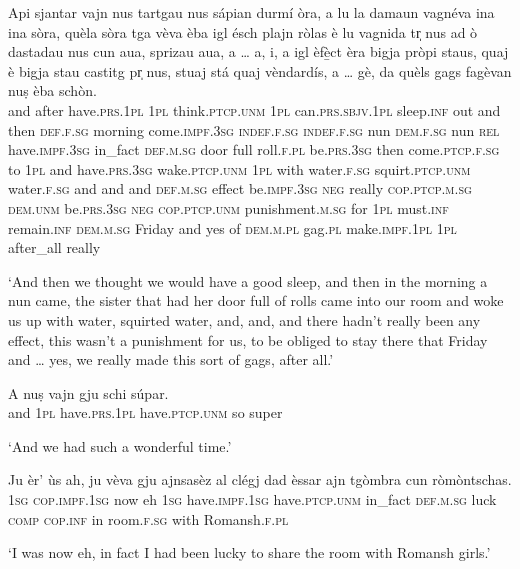 \begin{linenumbers}
\gll    Api sjantar vajn nus tartgau nus sápian durmí òra, a lu la damaun vagnéva ina ina sòra, quèla sòra tga vèva èba igl ésch plajn ròlas è lu vagnida tr̩ nus ad ò dastadau nus cun aua, sprizau aua, a … a, i, a igl èfè̱ct èra bigja pròpi staus, quaj è bigja stau castitg pr̩ nus, stuaj stá quaj vèndardís, a … gè, da quèls gags fagèvan nuṣ èba schòn.\\
and after have.\textsc{prs.1pl} \textsc{1pl} think.\textsc{ptcp.unm} \textsc{1pl}  can.\textsc{prs.sbjv.1pl} sleep.\textsc{inf} out and then \textsc{def.f.sg} morning come.\textsc{impf.3sg} \textsc{indef.f.sg} \textsc{indef.f.sg} nun \textsc{dem.f.sg} nun \textsc{rel} have.\textsc{impf.3sg} in\_fact \textsc{def.m.sg} door full roll.\textsc{f.pl} be.\textsc{prs.3sg} then come.\textsc{ptcp.f.sg} to \textsc{1pl} and have.\textsc{prs.3sg} wake.\textsc{ptcp.unm} \textsc{1pl} with water.\textsc{f.sg} squirt.\textsc{ptcp.unm} water.\textsc{f.sg} and {} and  and {} \textsc{def.m.sg} effect be.\textsc{impf.3sg} \textsc{neg} really  \textsc{cop.ptcp.m.sg} \textsc{dem.unm} be.\textsc{prs.3sg} \textsc{neg} \textsc{cop.ptcp.unm} punishment.\textsc{m.sg} for \textsc{1pl} must.\textsc{inf}  remain.\textsc{inf} \textsc{dem.m.sg} Friday and {} yes of \textsc{dem.m.pl} gag.\textsc{pl} make.\textsc{impf.1pl} \textsc{1pl} after\_all really\\
\end{linenumbers}
\medskip
\glt `And then we thought we would have a good sleep, and then in the morning a nun came, the sister that had her door full of rolls came into our room and woke us up with water, squirted water, and, and, and there hadn’t really been any effect, this wasn’t a punishment for us, to be obliged to stay there that Friday and … yes, we really made this sort of gags, after all.'
\medskip

\begin{linenumbers}
\gll    A nuṣ vajn gju schi súpar.\\
and \textsc{1pl} have.\textsc{prs.1pl} have.\textsc{ptcp.unm} so super\\
\end{linenumbers}
\medskip
\glt `And we had such a wonderful time.'
\medskip

\begin{linenumbers}
\gll    Ju èr' ùs ah, ju vèva gju ajnsasèz al clégj dad èssar ajn tgòmbra cun ròmòntschas.\\
 \textsc{1sg} \textsc{cop.impf.1sg} now eh \textsc{1sg} have.\textsc{impf.1sg} have.\textsc{ptcp.unm} in\_fact \textsc{def.m.sg} luck \textsc{comp} \textsc{cop.inf} in room.\textsc{f.sg} with Romansh.\textsc{f.pl}\\
\end{linenumbers}
\medskip
\glt `I was now eh, in fact I had been lucky to share the room with Romansh girls.'
\medskip


